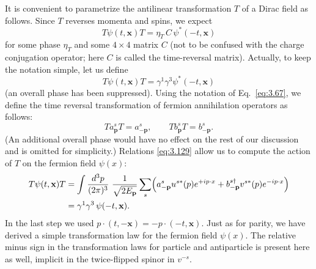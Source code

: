 It is convenient to parametrize the antilinear transformation $T$ of a
Dirac field as follows.  Since $T$ reverses momenta and spins, we expect
\begin{equation}
  T\psi(t,\mathbf{x})T = \eta_T\, C\,\psi^{*}(-t,\mathbf{x})
\end{equation}
for some phase $\eta_T$ and some $4\times4$ matrix $C$ (not to be confused
with the charge conjugation operator; here $C$ is called the time-reversal
matrix).  Actually, to keep the notation simple, let us define
\begin{equation}
  T\psi(t,\mathbf{x})T = \gamma^1\gamma^3\psi^{*}(-t,\mathbf{x})
  \label{eq:3.128}
\end{equation}
(an overall phase has been suppressed).  Using the notation of Eq.~\eqref{eq:3.67},
we define the time reversal transformation of fermion annihilation operators
as follows:
\begin{equation}
  T a_{\mathbf{p}}^s T = a_{-\mathbf{p}}^s,\qquad
  T b_{\mathbf{p}}^s T = b_{-\mathbf{p}}^s .
  \label{eq:3.129}
\end{equation}
(An additional overall phase would have no effect on the rest of our
discussion and is omitted for simplicity.)  Relations \eqref{eq:3.129} allow
us to compute the action of $T$ on the fermion field $\psi(x)$:
\begin{align}
  T\psi(t,\mathbf{x})T &= \int \frac{d^3p}{(2\pi)^3}\ \frac{1}{\sqrt{2E_{\mathbf{p}}}}
    \sum_s \Bigl( a_{-\mathbf{p}}^s u^{s*}(p)e^{+ip\cdot x}
      + b_{-\mathbf{p}}^{s\dagger} v^{s*}(p)e^{-ip\cdot x} \Bigr)\\
  &= \gamma^1\gamma^3\,\psi(-t,\mathbf{x}) .
  \label{eq:3.130}
\end{align}
In the last step we used $p\cdot(t,-\mathbf{x}) = -p\cdot(-t,\mathbf{x})$.
Just as for parity, we have derived a simple transformation law for the
fermion field $\psi(x)$.  The relative minus sign in the transformation laws
for particle and antiparticle is present here as well, implicit in the
twice-flipped spinor in $v^{-s}$.

